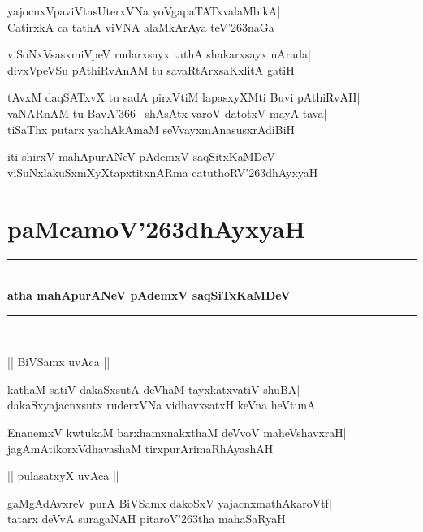 \documentclass[twoside,12pt,openright]{book}
\def\S{\char'263}
\newcounter{shloka}[chapter]
\begin{document}
\begin{shloka}%
yajocnxVpaviVtasUterxVNa yoVgapaTATxvalaMbikA|\\
CatirxkA ca tathA viVNA alaMkArAya teV\S naGa
\end{shloka}

\begin{shloka}%
viSoNxVsasxmiVpeV rudarxsayx tathA shakarxsayx nArada|\\
divxVpeVSu pAthiRvAnAM tu savaRtArxsaKxlitA gatiH
\end{shloka}

\begin{shloka}%
tAvxM daqSATxvX tu sadA pirxVtiM lapasxyXMti Buvi pAthiRvAH|\\
vaNARnAM tu BavA\char'366~ shAsAtx varoV datotxV mayA tava|\\
tiSaThx putarx yathAkAmaM seVvayxmAnasusxrAdiBiH
\end{shloka}

\begin{center}
 iti shirxV mahApurANeV pAdemxV saqSitxKaMDeV\\
viSuNxlakuSxmXyXtapxtitxnARma catuthoRV\S dhAyxyaH
\end{center}

\chapter{paMcamoV\S dhAyxyaH}
\begin{center}
\rule{2cm}{1pt}\\[.5cm]
{\LARGE\bfseries atha mahApurANeV pAdemxV saqSiTxKaMDeV}\\[.3cm]
\rule{2cm}{1pt}\\
\end{center}

\begin{center}
|| BiVSamx uvAca ||
\end{center}
\begin{shloka}%
kathaM satiV dakaSxsutA deVhaM tayxkatxvatiV shuBA|\\
dakaSxyajacnxsutx ruderxVNa vidhavxsatxH keVna heVtunA
\end{shloka}

\begin{shloka}%
EnanemxV kwtukaM barxhamxnakxthaM deVvoV maheVshavxraH|\\
jagAmAtikorxVdhavashaM tirxpurArimaRhAyashAH
\end{shloka}

\begin{center}
|| pulasatxyX uvAca ||
\end{center}
\begin{shloka}%
gaMgAdAvxreV purA BiVSamx dakoSxV yajacnxmathAkaroVtf|\\
tatarx deVvA suragaNAH pitaroV\S tha mahaSaRyaH
\end{shloka}
\end{document}
